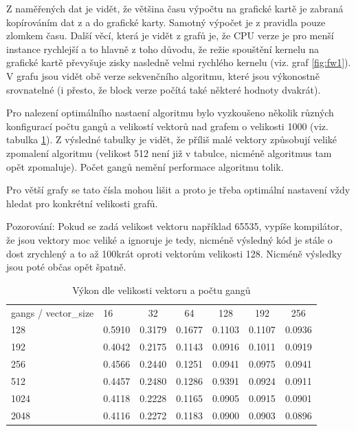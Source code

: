 \documentclass[11pt, fleqn]{article}
\begin{document}
Z naměřených dat je vidět, že většina času výpočtu na grafické kartě je zabraná kopírováním dat z a do grafické karty. Samotný výpočet je z pravidla pouze zlomkem času. Další věcí, která je vidět z grafů je, že CPU verze je pro menší instance rychlejší a to hlavně z toho důvodu, že režie spouštění kernelu na grafické kartě převyšuje zisky nasledně velmi rychlého kernelu (viz. graf \ref{fig:fw1}). V grafu jsou vidět obě verze sekvenčního algoritmu, které jsou výkonostně srovnatelné (i přesto, že block verze počítá také některé hodnoty dvakrát).

Pro nalezení optimálního nastaení algoritmu bylo vyzkoušeno několik různých konfigurací počtu gangů a velikostí vektorů nad grafem o velikosti 1000 (viz. tabulka \ref{fig:fw2}). Z výsledné tabulky je vidět, že příliš malé vektory způsobují veliké zpomalení algoritmu (velikost 512 není již v tabulce, nicméně algoritmus tam opět zpomaluje). Počet gangů nemění performace algoritmu tolik.

Pro větší grafy se tato čísla mohou lišit a proto je třeba optimální nastavení vždy hledat pro konkrétní velikosti grafů.

Pozorování: Pokud se zadá velikost vektoru například 65535, vypíše kompilátor, že jsou vektory moc veliké a ignoruje je tedy, nicméně výsledný kód je stále o dost zrychlený a to až 100krát oproti vektorům velikosti 128. Nicméně výsledky jsou poté občas opět špatně. 

\begin{table}[tbp]
  \centering
  \caption{Výkon dle velikosti vektoru a počtu gangů}
  \label{fig:fw2}
  \def\arraystretch{2}
  \begin{tabular}{llccccc}
    gangs / vector\_size & 16 & 32 & 64 & 128 & 192 & 256 \\
    \rowcolor[HTML]{ECF4FF} 
    128  & 0.5910 & 0.3179 & 0.1677 & 0.1103 & 0.1107 & 0.0936 \\
    192  & 0.4042 & 0.2175 & 0.1143 & 0.0916 & 0.1011 & 0.0919 \\
    \rowcolor[HTML]{ECF4FF} 
    256  & 0.4566 & 0.2440 & 0.1251 & 0.0941 & 0.0975 & 0.0941 \\
    512  & 0.4457 & 0.2480 & 0.1286 & 0.9391 & 0.0924 & 0.0911 \\
    \rowcolor[HTML]{ECF4FF} 
    1024 & 0.4118 & 0.2228 & 0.1165 & 0.0905 & 0.0915 & 0.0901 \\
    2048 & 0.4116 & 0.2272 & 0.1183 & 0.0900 & 0.0903 & 0.0896
  \end{tabular}
\end{table}
\end{document}
